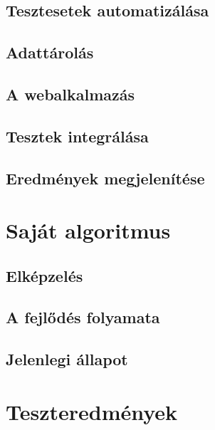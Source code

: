 \documentclass[12pt]{report} %
\begin{document}
\section{Tesztesetek automatizálása} %

\section{Adattárolás} %

\section{A webalkalmazás} %

\section{Tesztek integrálása} %

\section{Eredmények megjelenítése} %

\chapter{Saját algoritmus} %

\section{Elképzelés} %

\section{A fejlődés folyamata} %

\section{Jelenlegi állapot} %

\chapter{Teszteredmények} %
\end{document}
